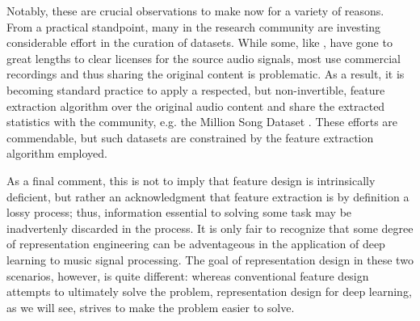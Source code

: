 Notably, these are crucial observations to make now for a variety of reasons.
From a practical standpoint, many in the research community are investing considerable effort in the curation of datasets.
While some, like \cite{Bittner2014Medleydb}, have gone to great lengths to clear licenses for the source audio signals, most use commercial recordings and thus sharing the original content is problematic.
As a result, it is becoming standard practice to apply a respected, but non-invertible, feature extraction algorithm over the original audio content and share the extracted statistics with the community, e.g. the Million Song Dataset \cite{Bertin2011Million}.
These efforts are commendable, but such datasets are constrained by the feature extraction algorithm employed.

As a final comment, this is not to imply that feature design is intrinsically deficient, but rather an acknowledgment that feature extraction is by definition a lossy process;
thus, information essential to solving some task may be inadvertenly discarded in the process.
It is only fair to recognize that some degree of representation engineering can be adventageous in the application of deep learning to music signal processing.
The goal of representation design in these two scenarios, however, is quite different:
whereas conventional feature design attempts to ultimately solve the problem, representation design for deep learning, as we will see, strives to make the problem easier to solve.
